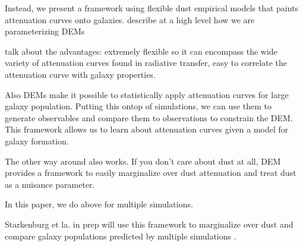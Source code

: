 Instead, we present a framework using flexible dust empirical models that
paints attenuation curves onto galaxies. describe at a high level how we are
parameterizing DEMs 

talk about the advantages: extremely flexible so it can encompass the wide variety of
attenuation curves found in radiative transfer, easy to correlate the
attenuation curve with galaxy properties. 

Also DEMs make it possible to statistically apply attenuation curves for large
galaxy population. Putting this ontop of simulations, we can use them to
generate observables and compare them to observations to constrain the DEM. 
This framework allows us to learn about attenuation curves given a model for 
galaxy formation. 

The other way around also works. If you don't care about dust at all, DEM
provides a framework to easily marginalize over dust attenuation and treat dust
as a nuisance parameter. 

In this paper, we do above for multiple simulations. 

Starkenburg et la. in prep will use this framework to marginalize over dust and compare galaxy populations predicted by multiple
simulations . 

